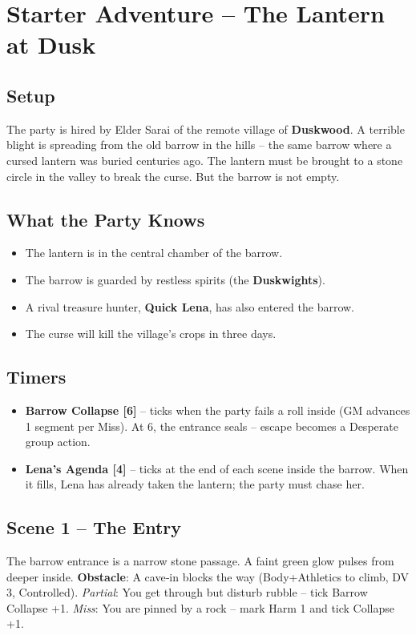 \documentclass[10pt, twocolumn]{article}
\begin{document}
\section{Starter Adventure -- The Lantern at Dusk}
\subsection*{Setup}
The party is hired by Elder Sarai of the remote village of \textbf{Duskwood}. A terrible blight is spreading from the old barrow in the hills -- the same barrow where a cursed lantern was buried centuries ago. The lantern must be brought to a stone circle in the valley to break the curse. But the barrow is not empty.

\subsection*{What the Party Knows}
\begin{itemize}
\item The lantern is in the central chamber of the barrow.
\item The barrow is guarded by restless spirits (the \textbf{Duskwights}).
\item A rival treasure hunter, \textbf{Quick Lena}, has also entered the barrow.
\item The curse will kill the village's crops in three days.
\end{itemize}

\subsection*{Timers}
\begin{itemize}
\item \textbf{Barrow Collapse [6]} -- ticks when the party fails a roll inside (GM advances 1 segment per Miss). At 6, the entrance seals -- escape becomes a Desperate group action.
\item \textbf{Lena's Agenda [4]} -- ticks at the end of each scene inside the barrow. When it fills, Lena has already taken the lantern; the party must chase her.
\end{itemize}

\subsection*{Scene 1 -- The Entry}
The barrow entrance is a narrow stone passage. A faint green glow pulses from deeper inside.  
\textbf{Obstacle}: A cave‑in blocks the way (Body+Athletics to climb, DV 3, Controlled).  
\textit{Partial}: You get through but disturb rubble -- tick Barrow Collapse +1.  
\textit{Miss}: You are pinned by a rock -- mark Harm 1 and tick Collapse +1.
\end{document}

